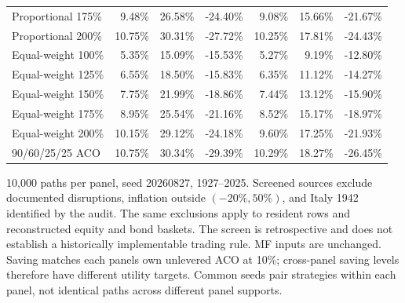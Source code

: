 \begin{table}[p]
{\begin{tabular}{lrrrrrr}
Proportional 175\% & 9.48\% & 26.58\% & -24.40\% & 9.08\% & 15.66\% & -21.67\% \\
Proportional 200\% & 10.75\% & 30.31\% & -27.72\% & 10.25\% & 17.81\% & -24.43\% \\
Equal-weight 100\% & 5.35\% & 15.09\% & -15.53\% & 5.27\% & 9.19\% & -12.80\% \\
Equal-weight 125\% & 6.55\% & 18.50\% & -15.83\% & 6.35\% & 11.12\% & -14.27\% \\
Equal-weight 150\% & 7.75\% & 21.99\% & -18.86\% & 7.44\% & 13.12\% & -15.90\% \\
Equal-weight 175\% & 8.95\% & 25.54\% & -21.16\% & 8.52\% & 15.17\% & -18.97\% \\
Equal-weight 200\% & 10.15\% & 29.12\% & -24.18\% & 9.60\% & 17.25\% & -21.93\% \\
90/60/25/25 ACO & 10.75\% & 30.34\% & -29.39\% & 10.29\% & 18.27\% & -26.45\% \\
\bottomrule\end{tabular}}
\par\smallskip\begin{minipage}{0.97\textwidth}\footnotesize 10,000 paths per panel, seed 20260827, 1927--2025. Screened sources exclude documented disruptions, inflation outside $(-20\%,50\%)$, and Italy 1942 identified by the audit. The same exclusions apply to resident rows and reconstructed equity and bond baskets. The screen is retrospective and does not establish a historically implementable trading rule. MF inputs are unchanged. Saving matches each panel\textquotesingle s own unlevered ACO at 10\%; cross-panel saving levels therefore have different utility targets. Common seeds pair strategies within each panel, not identical paths across different panel supports.\end{minipage}\end{table}
